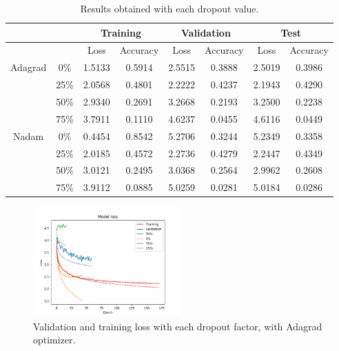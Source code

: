 \documentclass[]{article}
\begin{document}
\begin{table}[H]
	\centering
	\label{t:drop}
	\begin{tabular}{@{}cccccccc@{}}
		\toprule
		&      & \multicolumn{2}{c}{Training} & \multicolumn{2}{c}{Validation} & \multicolumn{2}{c}{Test} \\ \midrule
		&      & Loss         & Accuracy      & Loss          & Accuracy       & Loss       & Accuracy    \\
		\midrule
		Adagrad & 0\%  & 1.5133       & 0.5914        & 2.5515        & 0.3888         & 2.5019     & 0.3986      \\
		& 25\% & 2.0568       & 0.4801        & 2.2222        & 0.4237         & 2.1943     & 0.4290      \\
		& 50\% & 2.9340       & 0.2691        & 3.2668        & 0.2193         & 3.2500     & 0.2238      \\
		& 75\% & 3.7911       & 0.1110        & 4.6237        & 0.0455         & 4.6116     & 0.0449      \\
		\midrule
		Nadam   & 0\%  & 0.4454       & 0.8542        & 5.2706        & 0.3244         & 5.2349     & 0.3358      \\
		& 25\% & 2.0185       & 0.4572        & 2.2736        & 0.4279         & 2.2447     & 0.4349      \\
		& 50\% & 3.0121       & 0.2495        & 3.0368        & 0.2564         & 2.9962     & 0.2608      \\
		& 75\% & 3.9112       & 0.0885        & 5.0259        & 0.0281         & 5.0184     & 0.0286      \\ \bottomrule
	\end{tabular}
	\caption{Results obtained with each dropout value.}
\end{table}

\begin{figure}[H]
	\centering
	\includegraphics[width=0.5\textwidth]{dropout_adagrad_loss}
	\caption{Validation and training loss with each dropout factor, with Adagrad optimizer.}
	\label{f:drop2}
\end{figure}
\end{document}
